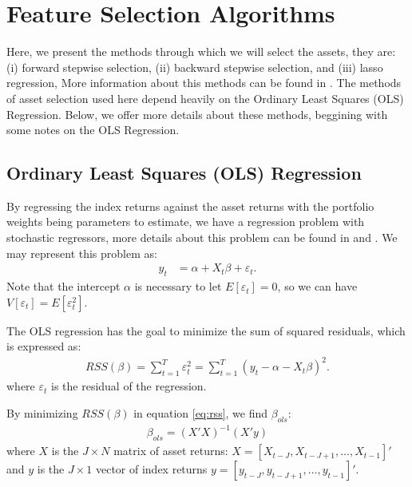 \documentclass[preprint,authoryear,review,12pt]{elsarticle}
\begin{document}
\section{Feature Selection Algorithms} \label{sec:selection}

Here, we present the methods through which we will select the assets, they are:
(i) forward stepwise selection, 
(ii) backward stepwise selection, 
and
(iii) lasso regression,
More information about this methods can be found in \cite{isl-2014}.
The methods of asset selection used here depend heavily on the Ordinary Least Squares (OLS) Regression.
Below, we offer more details about these methods, beggining with some notes on the OLS Regression.

\subsection{Ordinary Least Squares (OLS) Regression}

By regressing the index returns against the asset returns with the portfolio weights being parameters to estimate, we have a regression problem with stochastic regressors, more details about this problem can be found in \cite{rao-2008} and \cite{rencher-2007}.
We may represent this problem as:
\begin{align*} 
	y_{t} &= \alpha + X_{t}\beta + \varepsilon_{t}.
\end{align*}
Note that the intercept $\alpha$ is necessary to let $E[\varepsilon_{t}]=0$, so we can have $V[\varepsilon_{t}] = E[\varepsilon_{t}^2]$.

The OLS regression has the goal to minimize the sum of squared residuals, which is expressed as:
\begin{align} \label{eq:rss}
	RSS(\beta)
	= \sum_{t=1}^{T} \varepsilon_t^2
	= \sum_{t=1}^{T} (y_t - \alpha - X_t \beta)^2.
\end{align}
where $\varepsilon_{t}$ is the residual of the regression.

By minimizing $RSS(\beta)$ in equation \eqref{eq:rss}, we find $\beta_{ols}$:
\begin{align} 
	\label{eq:bols}
	\beta_{ols} = (X'X)^{-1}(X'y)
\end{align}
where $X$ is the $J \times N$ matrix of asset returns: $X = [X_{t-J}, X_{t-J+1}, \dots , X_{t-1}]'$ and $y$ is the $J\times 1$ vector of index returns $y = [y_{t-J}, y_{t-J+1}, \dots , y_{t-1}]'$.
\end{document}
